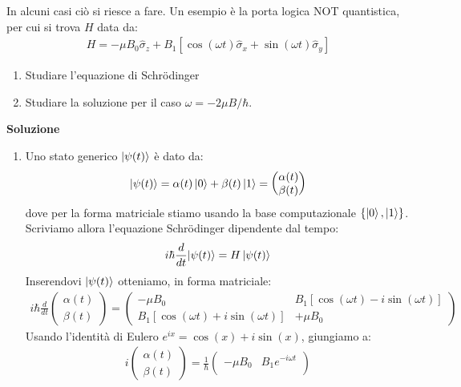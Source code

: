\documentclass[../../InformazioneQuantistica.tex]{subfiles}
\begin{document}
In alcuni casi ciò si riesce a fare. Un esempio è la porta logica NOT quantistica, per cui si trova $H$ data da:
\begin{align*}
H = - \mu B_0 \hat{\sigma}_z + B_1 [\cos(\omega t) \hat{\sigma}_x + \sin(\omega t) \hat{\sigma}_y] 
\end{align*}

\begin{enumerate}
\item Studiare l'equazione di Schr\"odinger
\item Studiare la soluzione per il caso $\omega = - 2\mu B/\hbar$.
\end{enumerate}

\textbf{Soluzione}
\begin{enumerate}
\item Uno stato generico $\Ket{\psi(t)}$ è dato da:
\begin{align*}
\Ket{\psi(t)} = \alpha(t) \Ket{0} + \beta(t) \Ket{1} = \begin{pmatrix}
\alpha(t)\\
\beta(t)
\end{pmatrix}
\end{align*}
dove per la forma matriciale stiamo usando la base computazionale $\{\Ket{0},\Ket{1}\}$.\\
Scriviamo allora l'equazione Schr\"odinger dipendente dal tempo:
\begin{align*}
i\hbar \frac{d}{dt}{\Ket{\psi(t)}} = H\Ket{\psi(t)}
\end{align*}
Inserendovi $\Ket{\psi(t)}$
otteniamo, in forma matriciale:
\begin{align*}
i\hbar \frac{d}{dt}\begin{pmatrix}\alpha(t)\\ \beta(t) \end{pmatrix} = \begin{pmatrix} -\mu B_0 & B_1 \left[\cos(\omega t)-i\sin(\omega t)\right]\\
B_1\left[ \cos(\omega t) + i\sin(\omega t)\right] & +\mu B_0\end{pmatrix}
\end{align*}
Usando l'identità di Eulero $e^{ix}=\cos(x)+i\sin(x)$, giungiamo a:
\begin{align*}
i\begin{pmatrix}
\alpha(t)\\
\beta(t)
\end{pmatrix}
=\frac{1}{\hbar}\begin{pmatrix}
-\mu B_0 & B_1 e^{-i\omega t}\\

\end{pmatrix}
\end{align*}
\end{enumerate}
\end{document}
